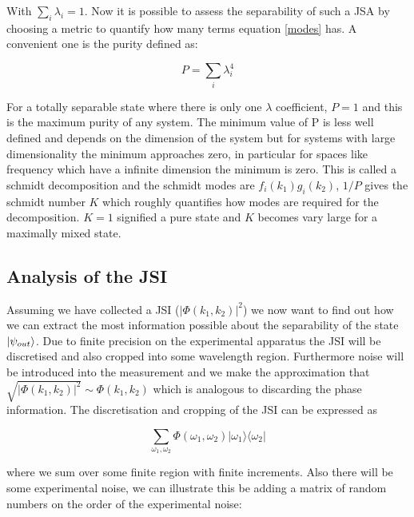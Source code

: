With $\sum_i \lambda_i=1$. Now it is possible to assess the separability of such a JSA by choosing a metric to quantify how many terms  equation \ref{modes} has. A convenient one is the purity defined as: 

\begin{equation} \label{purityEqn1}
	P = \sum_i \lambda_i^4
\end{equation}

For a totally separable state where there is only one $\lambda$ coefficient, $P=1$ and this is the maximum purity of any system. The minimum value of P is less well defined and depends on the dimension of the system but for systems with large dimensionality the minimum approaches zero, in particular for spaces like frequency which have a infinite dimension the minimum is zero. This is called a schmidt decomposition and the schmidt modes are $f_i(k_1)g_i(k_2)$, $1/P$ gives the schmidt number $K$ which roughly quantifies how modes are required for the decomposition. $K=1$ signified a pure state and $K$ becomes vary large for a maximally mixed state.


\subsection{Analysis of the JSI}

Assuming we have collected a JSI ($|\Phi(k_1,k_2)|^2$) we now want to find out how we can extract the most information possible about the separability of the state $\ket{\psi_{out}}$. Due to finite precision on the experimental apparatus the JSI will be discretised and also cropped into some wavelength region. Furthermore noise will be introduced into the measurement and we make the approximation that $\sqrt{|\Phi(k_1,k_2)|^2}\sim \Phi(k_1,k_2)$ which is analogous to discarding the phase information. The discretisation and cropping of the JSI can be expressed as

\begin{equation}
\sum_{\omega_1,\omega_2}\Phi(\omega_1,\omega_2)|\omega_1\rangle\langle\omega_2|
\end{equation}

where we sum over some finite region with finite increments. Also there will be some experimental noise, we can illustrate this be adding a matrix of random numbers on the order of the experimental noise:

